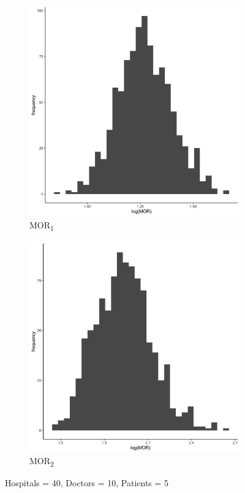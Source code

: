 \documentclass[
  letterpaper,
  DIV=11,
  numbers=noendperiod,
  titlepage]{scrartcl}
\begin{document}
\vspace{10mm}

\begin{figure}
\centering
\begin{subfigure}{.49\textwidth}
    \centering
    \includegraphics[width=.95\linewidth]{../../plots/three-lvl-ran-int/high-prev/hist_40_10_5_three_lvl_high_prev_mor1.png}  
    \caption{MOR\textsubscript{1}}
    \label{l40m10n51}
\end{subfigure}
\begin{subfigure}{.49\textwidth}
    \centering
    \includegraphics[width=.95\linewidth]{../../plots/three-lvl-ran-int/high-prev/hist_40_10_5_three_lvl_high_prev_mor2.png}
    \caption{MOR\textsubscript{2}}
    \label{l40m10n52}
\end{subfigure}
\caption{Hospitals = 40, Doctors = 10, Patients = 5}
\label{mor2}
\end{figure}
\end{document}
